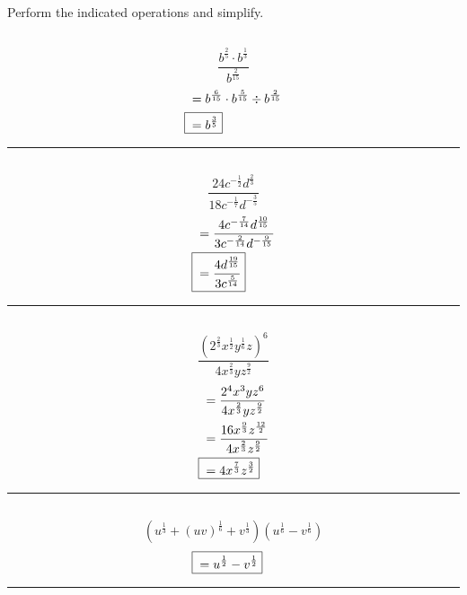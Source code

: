 


\section{}
	Perform the indicated operations and simplify.

	\subsection{}
		\[\frac{b^{\frac{2}{5}} \cdot b^{\frac{1}{3}}}{b^{\frac{2}{15}}}\]
		\begin{align*}
			&= b^{\frac{6}{15}} \cdot b^{\frac{5}{15}} \div b^{\frac{2}{15}} \\
			\Aboxed{{} &= b^{\frac{3}{5}}}
		\end{align*}
		\hrule{}

	\subsection{}
		\[\frac{24c^{-\frac{1}{2}}d^{\frac{2}{3}}}{18c^{-\frac{1}{7}}d^{-\frac{3}{5}}}\]
		\begin{align*}
			&= \frac{4c^{-\frac{7}{14}}d^{\frac{10}{15}}}{3c^{-\frac{2}{14}}d^{-\frac{9}{15}}} \\
			\Aboxed{{} &= \frac{4d^{\frac{19}{15}}}{3c^{\frac{5}{14}}}}
		\end{align*}
		\hrule{}

	\subsection{}
		\[\frac{{(2^{\frac{2}{3}}x^{\frac{1}{2}}y^{\frac{1}{6}}z)}^6}{4x^{\frac{2}{3}}yz^{\frac{9}{2}}}\]
		\begin{align*}
			&= \frac{2^4x^3yz^6}{4x^{\frac{2}{3}}yz^{\frac{9}{2}}} \\
			&= \frac{16x^{\frac{9}{3}}z^{\frac{12}{2}}}{4x^{\frac{2}{3}}z^{\frac{9}{2}}} \\
			\Aboxed{{} &= 4x^{\frac{7}{3}}z^{\frac{3}{2}}}
		\end{align*}
		\hrule{}

	\subsection{}
		\[(u^{\frac{1}{3}} + {(uv)}^{\frac{1}{6}} + v^{\frac{1}{3}})(u^{\frac{1}{6}} - v^{\frac{1}{6}})\]
		\begin{align*}
			\Aboxed{{} &= u^{\frac{1}{2}} - v^{\frac{1}{2}}}
		\end{align*}
		\hrule{}

